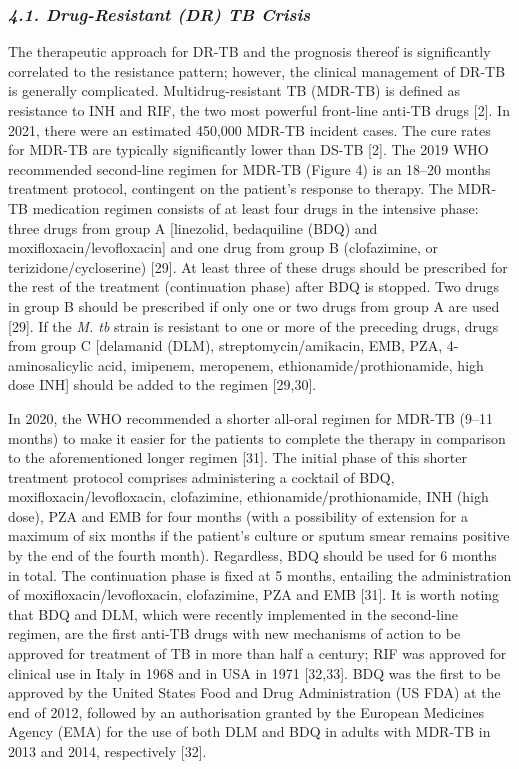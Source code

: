 \documentclass{article}
\begin{document}
\subsubsection{\textit{4.1. Drug-Resistant (DR) TB Crisis}}

The therapeutic approach for DR-TB and the prognosis thereof is significantly correlated to the resistance pattern; however, the clinical management of DR-TB is generally complicated. Multidrug-resistant TB (MDR-TB) is defined as resistance to INH and RIF, the two most powerful front-line anti-TB drugs [2]. In 2021, there were an estimated 450,000 MDR-TB incident cases. The cure rates for MDR-TB are typically significantly lower than DS-TB [2]. The 2019 WHO recommended second-line regimen for MDR-TB (Figure 4) is an 18–20 months treatment protocol, contingent on the patient's response to therapy. The MDR-TB medication regimen consists of at least four drugs in the intensive phase: three drugs from group A [linezolid, bedaquiline (BDQ) and moxifloxacin/levofloxacin] and one drug from group B (clofazimine, or terizidone/cycloserine) [29]. At least three of these drugs should be prescribed for the rest of the treatment (continuation phase) after BDQ is stopped. Two drugs in group B should be prescribed if only one or two drugs from group A are used [29]. If the \textit{M. tb} strain is resistant to one or more of the preceding drugs, drugs from group C [delamanid (DLM), streptomycin/amikacin, EMB, PZA, 4-aminosalicylic acid, imipenem, meropenem, ethionamide/prothionamide, high dose INH] should be added to the regimen [29,30].

In 2020, the WHO recommended a shorter all-oral regimen for MDR-TB (9–11 months) to make it easier for the patients to complete the therapy in comparison to the aforementioned longer regimen [31]. The initial phase of this shorter treatment protocol comprises administering a cocktail of BDQ, moxifloxacin/levofloxacin, clofazimine, ethionamide/prothionamide, INH (high dose), PZA and EMB for four months (with a possibility of extension for a maximum of six months if the patient's culture or sputum smear remains positive by the end of the fourth month). Regardless, BDQ should be used for 6 months in total. The continuation phase is fixed at 5 months, entailing the administration of moxifloxacin/levofloxacin, clofazimine, PZA and EMB [31]. It is worth noting that BDQ and DLM, which were recently implemented in the second-line regimen, are the first anti-TB drugs with new mechanisms of action to be approved for treatment of TB in more than half a century; RIF was approved for clinical use in Italy in 1968 and in USA in 1971 [32,33]. BDQ was the first to be approved by the United States Food and Drug Administration (US FDA) at the end of 2012, followed by an authorisation granted by the European Medicines Agency (EMA) for the use of both DLM and BDQ in adults with MDR-TB in 2013 and 2014, respectively [32].
\end{document}
